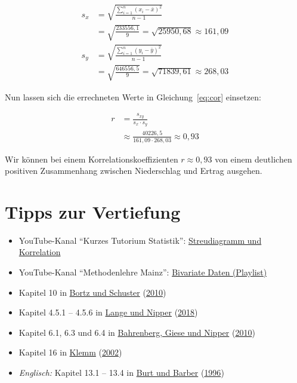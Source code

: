 \documentclass[
  11pt,
  ngerman,
  a4paper,
]{report}
\providecommand{\tightlist}{%
  \setlength{\itemsep}{0pt}\setlength{\parskip}{0pt}}
\begin{document}
\[\begin{aligned}
s_{x}&=\sqrt{\frac{\sum\limits^n_{i=1}(x_i-\bar{x})^2}{n-1}}\\[5pt]
     &=\sqrt{\frac{233556,1}{9}}=\sqrt{25950,68}\approx161,09\\[6pt]
s_{y}&=\sqrt{\frac{\sum\limits^n_{i=1}(y_i-\bar{y})^2}{n-1}}\\[5pt]
     &=\sqrt{\frac{646556,5}{9}}=\sqrt{71839,61} \approx268,03
\end{aligned}\]

Nun lassen sich die errechneten Werte in Gleichung~\eqref{eq:cor} einsetzen:

\[\begin{aligned}
r&=\frac{s_{xy}}{s_x\cdot s_y}\\[4pt]
&\approx\frac{40226,5}{161,09\cdot268,03}\approx0,93
\end{aligned}\]

Wir können bei einem Korrelationskoeffizienten \(r\approx0,93\) von einem deutlichen positiven Zusammenhang zwischen Niederschlag und Ertrag ausgehen.

\hypertarget{tipps-zur-vertiefung-6}{%
\section*{Tipps zur Vertiefung}\label{tipps-zur-vertiefung-6}}

\begin{itemize}
\tightlist
\item
  YouTube-Kanal \enquote{Kurzes Tutorium Statistik}: \href{https://www.youtube.com/watch?v=IwJ7RPIAxUo}{Streudiagramm und Korrelation}
\item
  YouTube-Kanal \enquote{Methodenlehre Mainz}: \href{https://www.youtube.com/playlist?list=PLJ-Cm_fyeZdwUkkeXkl2D1Czukhhl-9B2}{Bivariate Daten (Playlist)}
\item
  Kapitel 10 in \protect\hyperlink{ref-bortz}{Bortz und Schuster} (\protect\hyperlink{ref-bortz}{2010})
\item
  Kapitel 4.5.1 -- 4.5.6 in \protect\hyperlink{ref-delange}{Lange und Nipper} (\protect\hyperlink{ref-delange}{2018})
\item
  Kapitel 6.1, 6.3 und 6.4 in \protect\hyperlink{ref-bahrenberg}{Bahrenberg, Giese und Nipper} (\protect\hyperlink{ref-bahrenberg}{2010})
\item
  Kapitel 16 in \protect\hyperlink{ref-klemm}{Klemm} (\protect\hyperlink{ref-klemm}{2002})
\item
  \emph{Englisch:} Kapitel 13.1 -- 13.4 in \protect\hyperlink{ref-burt}{Burt und Barber} (\protect\hyperlink{ref-burt}{1996})
\end{itemize}
\end{document}
